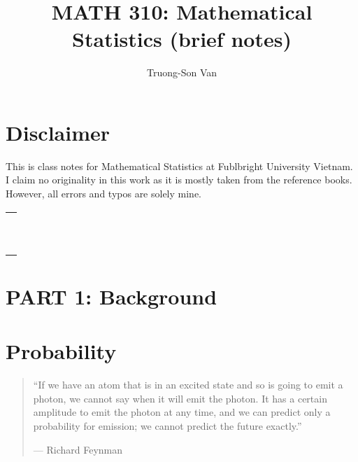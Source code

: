\documentclass[
  openany]{book}
\title{MATH 310: Mathematical Statistics (brief notes)}
\author{Truong-Son Van}
\date{}
\theoremstyle{definition}
\theoremstyle{definition}
\theoremstyle{definition}
\theoremstyle{definition}
\theoremstyle{remark}
\begin{document}
\maketitle

{
\setcounter{tocdepth}{2}
\tableofcontents
}
\chapter*{Disclaimer}\label{disclaimer}


This is class notes for Mathematical Statistics at Fublbright University Vietnam.
I claim no originality in this work as it is mostly taken from the reference books.
However, all errors and typos are solely mine.

\begin{longtable}[]{@{}l@{}}
\toprule\noalign{}
\endhead
\bottomrule\noalign{}
\endlastfoot
 \\
 \\
\newcommand{\vect}{\mathbf} \\
\newcommand{\R}{\mathbb{R}} \\
\newcommand{\N}{\mathbb{N}} \\
\renewcommand{\P}{\mathbb{P}} \\
\newcommand{\cP}{\mathcal{P}} \\
\newcommand{\cF}{\mathcal{F}} \\
\newcommand{\cB}{\mathcal{B}} \\
 \\
\end{longtable}

\newpage

\chapter*{PART 1: Background}\label{part-1-background}


\chapter{Probability}\label{probability}

\begin{quote}
``If we have an atom that is in an excited state and so is going to emit a photon, we cannot say when it will emit the photon. It has a certain amplitude to emit the photon at any time, and we can predict only a probability for emission; we cannot predict the future exactly.''

\hfill --- Richard Feynman
\end{quote}
\end{document}
